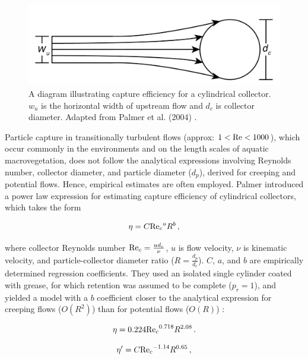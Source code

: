 \documentclass[geosciences,article,submit,moreauthors,pdftex]{Definitions/mdpi}
\begin{document}
\begin{figure}[H]
\includegraphics[width=5in]{../pics/collectorefficiency.png}
\centering
\caption{A diagram illustrating capture efficiency for a cylindrical collector. $w_u$ is the horizontal width of upstream flow and $d_c$ is collector diameter. Adapted from Palmer et al. (2004) \cite{Palmer_2004}.}
\label{fig:capeff}
\end{figure}

Particle capture in transitionally turbulent flows (approx: $1<\mathrm{Re}<1000$), which occur commonly in the environments and on the length scales of aquatic macrovegetation, does not follow the analytical expressions involving Reynolds number, collector diameter, and particle diameter ($d_p$), derived for creeping \cite{lamb1932, langmuir1942filtration, fuchs1965mechanics} and potential \cite{fuchs1965mechanics} flows. Hence, empirical estimates are often employed. Palmer \cite{Palmer_2004} introduced a power law expression for estimating capture efficiency of cylindrical collectors, which takes the form 

\begin{equation}
    \eta=C{\mathrm{Re}_c}^{a}R^{b}\,,
    \label{eq:powerlaw}
\end{equation}

\noindent where collector Reynolds number $\mathrm{Re}_c=\frac{ud_c}{\nu}$, $u$ is flow velocity, $\nu$ is kinematic velocity, and particle-collector diameter ratio ($R=\frac{d_p}{d_c}$). $C$, $a$, and $b$ are empirically determined regression coefficients. They used an isolated single cylinder coated with grease, for which retention was assumed to be complete ($p_r = 1$), and yielded a model with a $b$ coefficient closer to the analytical expression for creeping flows ($O(R^2)$) than for potential flows ($O(R)$) \cite{fuchs1965mechanics}:

\begin{equation}
    \eta=0.224{\mathrm{Re}_c}^{0.718}R^{2.08}\,.
    \label{eq:palmer}
\end{equation}

\begin{equation}
    \eta^\prime=C{\mathrm{Re}_c}^{-1.14}R^{0.65}\,,
    \label{eq:fauria}
\end{equation}
\end{document}
